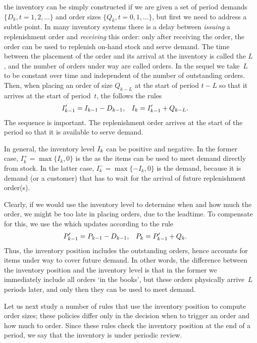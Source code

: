 \documentclass[stochastic-or.tex]{subfiles}
\begin{document}
 the inventory can be simply constructed if we are given a set of period demands $\{D_k, t=1, 2, \ldots\}$ and order sizes $\{Q_k, t=0, 1, \ldots\}$, but first we need to address a subtle point.
In many inventory systems there is a delay between \emph{issuing} a replenishment order and \emph{receiving} this order:  only after receiving the order, the order can be used to replenish on-hand stock and serve demand.  The time between the placement of the order and its arrival at the inventory is called the  $L$, and the number of orders under way are called  orders. In the sequel we take~$L$ to be constant over time and independent of the number of outstanding orders.
Then, when placing an order of size $Q_{k-L}$ at the start of period $t-L$ so that it arrives at the start of period~$t$,  the   follows  the rules
\begin{align}\label{eq:i5}
 I_{k-1}' &= I_{k-1} - D_{k-1},  & I_{k} &= I_{k-1}' + Q_{k-L}.
\end{align}
The sequence is important. The replenishment order arrives at the start of the period so that it is available to serve demand.

In general, the inventory level $I_k$ can be positive and negative.
In the former case, $I_k^{+} = \max\{I_k,0\}$ is the  as the items can be used to meet demand directly from stock.
In the latter case, $I^{-}_k = \max\{-I_k, 0\}$ is the  demand, because it is demand (or a customer) that has to wait for the arrival of future replenishment order(s).

Clearly, if we would use the inventory level to determine when and how much the order, we might be too late in placing orders, due to the leadtime. To compensate for this, we use the   which updates according to the rule
\begin{align}\label{eq:b9}
P_{k-1}' &= P_{k-1}- D_{k-1},  &  P_k &= P_{k-1}' + Q_k.
\end{align}
Thus, the inventory position includes the outstanding orders, hence accounts for items under way to cover future demand.
In other words, the difference between the inventory position and the inventory level is that in the former we immediately include all orders `in the books', but these orders physically arrive~$L$ periods later, and only then they can be used to meet demand.


Let us next study a number of rules that use the inventory position to compute order sizes; these policies differ only in the decision when to trigger an order and how much to order. Since these rules check the inventory position at the end of a period, we say that the inventory is under periodic review.
\end{document}
